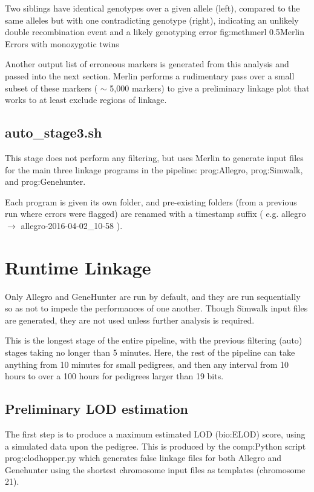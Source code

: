	{Two siblings have identical genotypes over a given allele (left), compared to the same alleles but with one contradicting genotype (right), indicating an unlikely double recombination event and a likely genotyping error}
	{fig:methmerl}
	{0.5}{Merlin Errors with monozygotic twins}

Another output list of erroneous markers is generated from this analysis and passed into the next section. Merlin performs a rudimentary pass over a small subset of these markers ( $\sim$ 5,000 markers) to give a preliminary linkage plot that works to at least exclude regions of linkage.

\subsection{auto\_stage3.sh}

This stage does not perform any filtering, but uses Merlin to generate input files for the main three linkage programs in the pipeline: \gls{prog:Allegro}, \gls{prog:Simwalk}, and \gls{prog:Genehunter}.

Each program is given its own folder, and pre-existing folders (from a previous run where errors were flagged) are renamed with a timestamp suffix ( e.g. allegro \(\rightarrow\) allegro-2016-04-02\_10-58 ).


\section{Runtime Linkage}

Only Allegro and GeneHunter are run by default, and they are run sequentially so as not to impede the performances of one another. Though Simwalk input files are generated, they are not used unless further analysis is required.

This is the longest stage of the entire pipeline, with the previous filtering (auto) stages taking no longer than 5 minutes. Here, the rest of the pipeline can take anything from 10 minutes for small pedigrees, and then any interval from 10 hours to over a 100 hours for pedigrees larger than 19 bits.

\subsection{Preliminary LOD estimation}

The first step is to produce a maximum estimated LOD (\gls{bio:ELOD}) score, using a simulated data upon the pedigree.  This is produced by the \gls{comp:Python} script \gls{prog:clodhopper.py} which generates false linkage files for both Allegro and Genehunter using the shortest chromosome input files as templates (chromosome 21).

